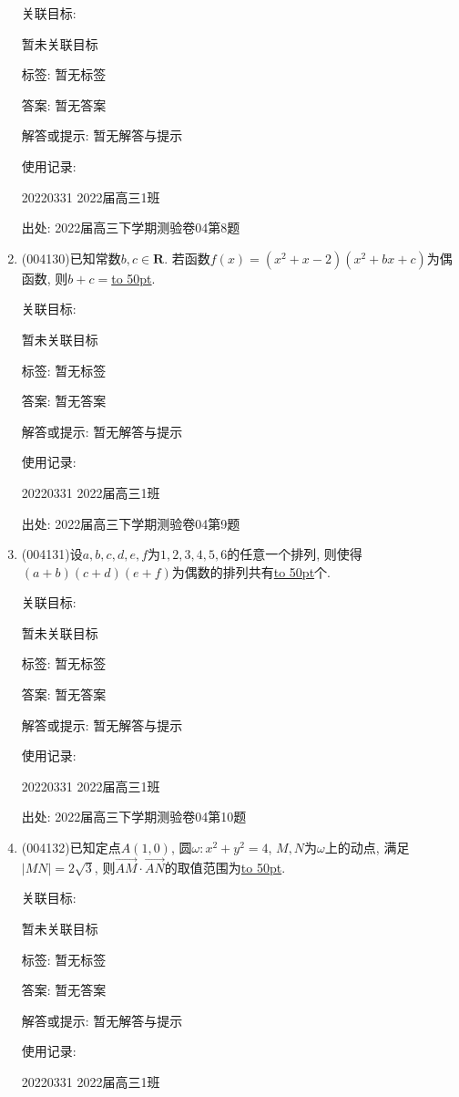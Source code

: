 \documentclass[10pt,a4paper]{article}
\newcommand{\blank}[1]{\underline{\hbox to #1pt{}}}
\begin{document}
\begin{enumerate}[1.]
关联目标:

暂未关联目标



标签: 暂无标签

答案: 暂无答案

解答或提示: 暂无解答与提示

使用记录:

20220331	2022届高三1班	


出处: 2022届高三下学期测验卷04第8题
\item { (004130)}已知常数$b,c\in \mathbf{R}$. 若函数$f(x)=(x^2+x-2)(x^2+bx+c)$为偶函数, 则$b+c=$\blank{50}.


关联目标:

暂未关联目标



标签: 暂无标签

答案: 暂无答案

解答或提示: 暂无解答与提示

使用记录:

20220331	2022届高三1班	


出处: 2022届高三下学期测验卷04第9题
\item { (004131)}设$a,b,c,d,e,f$为$1,2,3,4,5,6$的任意一个排列, 则使得$(a+b)(c+d)(e+f)$为偶数的排列共有\blank{50}个.


关联目标:

暂未关联目标



标签: 暂无标签

答案: 暂无答案

解答或提示: 暂无解答与提示

使用记录:

20220331	2022届高三1班	


出处: 2022届高三下学期测验卷04第10题
\item { (004132)}已知定点$A(1,0)$, 圆$\omega:x^2+y^2=4$, $M,N$为$\omega$上的动点, 满足$|MN|=2\sqrt{3}$, 则$\overrightarrow{AM}\cdot \overrightarrow{AN}$的取值范围为\blank{50}.


关联目标:

暂未关联目标



标签: 暂无标签

答案: 暂无答案

解答或提示: 暂无解答与提示

使用记录:

20220331	2022届高三1班	



\end{enumerate}
\end{document}
